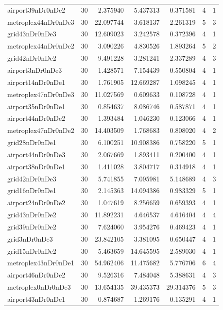 \documentclass[../../../thesis.tex]{subfiles}
\begin{document}
\begin{longtable}{|l|r|r|r|r|r|r|}
airport39nDr0nDe2 & 30 & 2.375940 & 5.437313 & 0.371581 & 4 & 1 \\
metroplex44nDr0nDe3 & 30 & 22.097744 & 3.618137 & 2.261319 & 5 & 3 \\
grid43nDr0nDe3 & 30 & 12.609023 & 3.242578 & 0.372396 & 4 & 1 \\
metroplex44nDr0nDe2 & 30 & 3.090226 & 4.830526 & 1.893264 & 5 & 2 \\
grid42nDr0nDe2 & 30 & 9.491228 & 3.281241 & 2.337289 & 4 & 3 \\
airport3nDr0nDe3 & 30 & 1.428571 & 7.154439 & 0.550804 & 4 & 1 \\
airport14nDr0nDe1 & 30 & 1.761905 & 12.669287 & 1.098245 & 4 & 1 \\
metroplex47nDr0nDe3 & 30 & 11.027569 & 0.609633 & 0.108728 & 4 & 1 \\
airport35nDr0nDe1 & 30 & 0.854637 & 8.086746 & 0.587871 & 4 & 1 \\
airport44nDr0nDe2 & 30 & 1.393484 & 1.046230 & 0.123066 & 4 & 1 \\
metroplex47nDr0nDe2 & 30 & 14.403509 & 1.768683 & 0.808020 & 4 & 2 \\
grid28nDr0nDe1 & 30 & 6.100251 & 10.908386 & 0.758220 & 5 & 1 \\
airport44nDr0nDe3 & 30 & 2.067669 & 1.893411 & 0.200400 & 4 & 1 \\
airport38nDr0nDe1 & 30 & 1.411028 & 3.804717 & 0.314918 & 4 & 1 \\
grid42nDr0nDe3 & 30 & 5.741855 & 7.095981 & 5.148689 & 4 & 3 \\
grid16nDr0nDe1 & 30 & 2.145363 & 14.094386 & 0.983329 & 5 & 1 \\
airport24nDr0nDe2 & 30 & 1.047619 & 8.256659 & 0.659393 & 4 & 1 \\
grid43nDr0nDe2 & 30 & 11.892231 & 4.646537 & 4.616404 & 4 & 4 \\
grid39nDr0nDe2 & 30 & 7.624060 & 3.954276 & 0.469423 & 4 & 1 \\
grid3nDr0nDe3 & 30 & 23.842105 & 3.381095 & 0.650447 & 4 & 1 \\
grid15nDr0nDe2 & 30 & 5.463659 & 14.645595 & 2.589030 & 4 & 1 \\
metroplex43nDr0nDe1 & 30 & 54.962406 & 11.475682 & 5.776706 & 6 & 4 \\
airport46nDr0nDe2 & 30 & 9.526316 & 7.484048 & 5.388631 & 4 & 3 \\
metroplex0nDr0nDe3 & 30 & 13.654135 & 39.435373 & 29.314376 & 5 & 3 \\
airport43nDr0nDe1 & 30 & 0.874687 & 1.269176 & 0.135291 & 4 & 1 \\

\end{longtable}
\end{document}
